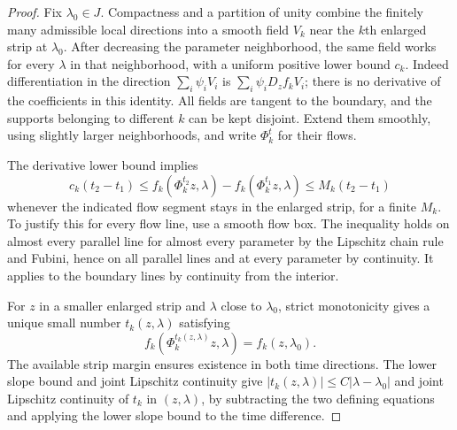 \documentclass[11pt]{article}
\numberwithin{equation}{section}
\theoremstyle{definition}
\theoremstyle{remark}
\begin{document}
\begin{proof}
Fix $\lambda_0\in J$.  Compactness and a partition of unity combine
the finitely many admissible local directions into a smooth field
$V_k$ near the $k$th enlarged strip at $\lambda_0$.  After decreasing
the parameter neighborhood, the same field works for every
$\lambda$ in that neighborhood, with a uniform positive lower bound
$c_k$.  Indeed differentiation in the direction
$\sum_i\psi_iV_i$ is $\sum_i\psi_iD_zf_kV_i$; there is no
derivative of the coefficients in this identity.  All fields are
tangent to the boundary, and the supports belonging to different
$k$ can be kept disjoint.  Extend them smoothly, using slightly
larger neighborhoods, and write $\Phi_k^t$ for their flows.

The derivative lower bound implies
\[
 c_k(t_2-t_1)\leq
 f_k(\Phi_k^{t_2}z,\lambda)-f_k(\Phi_k^{t_1}z,\lambda)
 \leq M_k(t_2-t_1)
\]
whenever the indicated flow segment stays in the enlarged strip,
for a finite $M_k$.  To justify this for every flow line, use a
smooth flow box.  The inequality holds on almost every parallel
line for almost every parameter by the Lipschitz chain rule and
Fubini, hence on all parallel lines and at every parameter by
continuity.  It applies to the boundary lines by continuity from the
interior.

For $z$ in a smaller enlarged strip and $\lambda$ close to
$\lambda_0$, strict monotonicity gives a unique small number
$t_k(z,\lambda)$ satisfying
\[
 f_k(\Phi_k^{t_k(z,\lambda)}z,\lambda)
       =f_k(z,\lambda_0).
\]
The available strip margin ensures existence in both time directions.
The lower slope bound and joint Lipschitz continuity give
$|t_k(z,\lambda)|\leq C|\lambda-\lambda_0|$ and joint
Lipschitz continuity of $t_k$ in $(z,\lambda)$, by subtracting the
two defining equations and applying the lower slope bound to the
time difference.


\end{proof}
\end{document}
